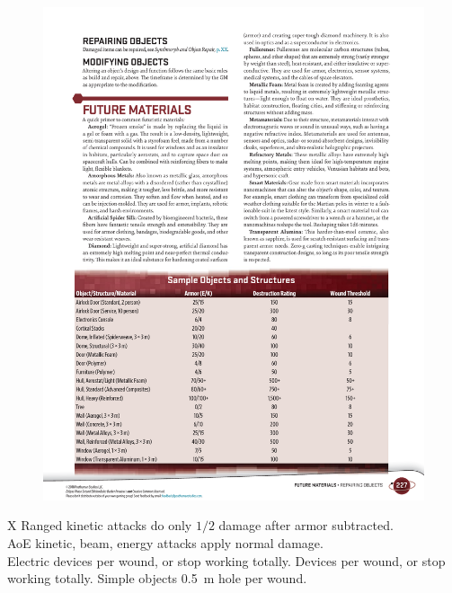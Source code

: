 \begin{figure}[h!]%
   \includegraphics[scale=0.71]{gfx/combat-objects}%
\end{figure}%

\begin{eptable}{ X }
   Ranged kinetic attacks do only $1/2$ damage after armor subtracted.\\
   AoE kinetic, beam, energy attacks apply normal damage.\\
   Electric devices  per wound, or stop working totally.
   Devices  per wound, or stop working totally.
   Simple objects \SI{.5}{m} hole per wound.
\end{eptable}


\bigskip

